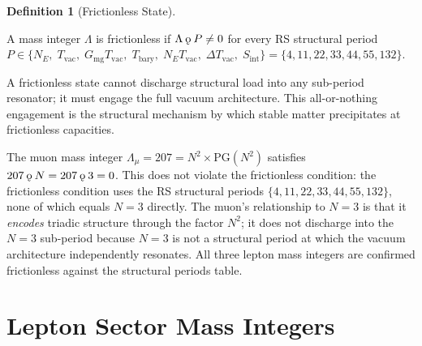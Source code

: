 \documentclass[11pt,letterpaper]{article}
\theoremstyle{plain}
\theoremstyle{definition}
\newtheorem{definition}[theorem]{Definition}
\theoremstyle{remark}
\newcommand{\koppa}{\mathbin{\text{\rm\k{o}}}}
\newcommand{\Tbary}{T_{\mathrm{bary}}}
\newcommand{\Sint}{S_{\mathrm{int}}}
\newcommand{\PG}{\mathrm{PG}}
\newcommand{\Gmg}{G_{\mathrm{mg}}}
\newcommand{\Tvac}{T_{\mathrm{vac}}}
\newcommand{\Lambdamu}{\Lambda_\mu}
\begin{document}
\begin{definition}[Frictionless State]\label{def:frictionless}
\begin{rsbox}
A mass integer $\Lambda$ is frictionless if
$\Lambda\koppa P\neq0$ for every RS structural period
$P\in\{N_E,\;\Tvac,\;\Gmg\Tvac,\;\Tbary,\;N_E\Tvac,\;
\Delta\Tvac,\;\Sint\}=\{4,11,22,33,44,55,132\}$.

A frictionless state cannot discharge structural load into any
sub-period resonator; it must engage the full vacuum architecture.
This all-or-nothing engagement is the structural mechanism by which
stable matter precipitates at frictionless capacities.
\end{rsbox}
\end{definition}

\begin{observebox}
The muon mass integer $\Lambdamu=207=N^2\times\PG(N^2)$ satisfies
$207\koppa N=207\koppa3=0$.  This does not violate the frictionless
condition: the frictionless condition uses the RS structural periods
$\{4,11,22,33,44,55,132\}$, none of which equals $N=3$ directly.
The muon's relationship to $N=3$ is that it \emph{encodes} triadic
structure through the factor $N^2$; it does not discharge into the
$N=3$ sub-period because $N=3$ is not a structural period at which the
vacuum architecture independently resonates.  All three lepton mass
integers are confirmed frictionless against the structural periods
table.
\end{observebox}


\section{Lepton Sector Mass Integers}\label{sec:leptons}
\end{document}
